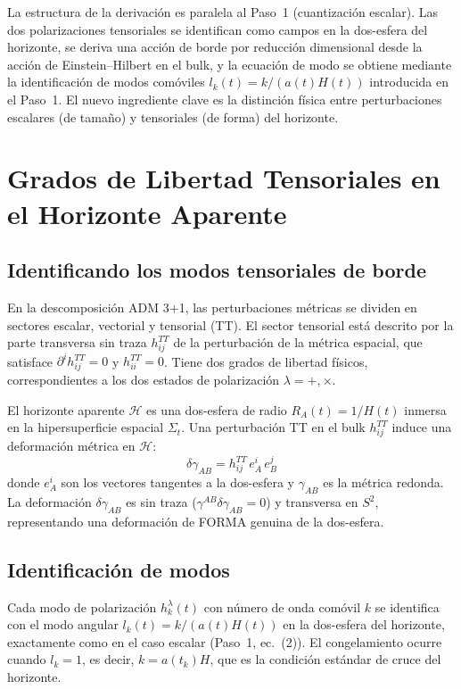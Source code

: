 \documentclass[12pt,a4paper]{article}
\begin{document}
La estructura de la derivación es paralela al Paso~1 (cuantización escalar). Las dos polarizaciones tensoriales se identifican como campos en la dos-esfera del horizonte, se deriva una acción de borde por reducción dimensional desde la acción de Einstein--Hilbert en el bulk, y la ecuación de modo se obtiene mediante la identificación de modos comóviles $l_k(t) = k/(a(t)H(t))$ introducida en el Paso~1. El nuevo ingrediente clave es la distinción física entre perturbaciones escalares (de tamaño) y tensoriales (de forma) del horizonte.

\section{Grados de Libertad Tensoriales en el Horizonte Aparente}

\subsection{Identificando los modos tensoriales de borde}

En la descomposición ADM 3+1, las perturbaciones métricas se dividen en sectores escalar, vectorial y tensorial (TT). El sector tensorial está descrito por la parte transversa sin traza $h_{ij}^{TT}$ de la perturbación de la métrica espacial, que satisface $\partial^i h_{ij}^{TT} = 0$ y $h^{TT}_{ii} = 0$. Tiene dos grados de libertad físicos, correspondientes a los dos estados de polarización $\lambda = +, \times$.

El horizonte aparente $\mathcal{H}$ es una dos-esfera de radio $R_A(t) = 1/H(t)$ inmersa en la hipersuperficie espacial $\Sigma_t$. Una perturbación TT en el bulk $h_{ij}^{TT}$ induce una deformación métrica en $\mathcal{H}$:
\begin{equation}
\delta\gamma_{AB} = h_{ij}^{TT}\,e^i_A\,e^j_B \tag{1}
\end{equation}
donde $e^i_A$ son los vectores tangentes a la dos-esfera y $\gamma_{AB}$ es la métrica redonda. La deformación $\delta\gamma_{AB}$ es sin traza ($\gamma^{AB}\delta\gamma_{AB} = 0$) y transversa en $S^2$, representando una deformación de FORMA genuina de la dos-esfera.

\subsection{Identificación de modos}

Cada modo de polarización $h_k^\lambda(t)$ con número de onda comóvil $k$ se identifica con el modo angular $l_k(t) = k/(a(t)H(t))$ en la dos-esfera del horizonte, exactamente como en el caso escalar (Paso~1, ec.~(2)). El congelamiento ocurre cuando $l_k = 1$, es decir, $k = a(t_k)H$, que es la condición estándar de cruce del horizonte.
\end{document}
